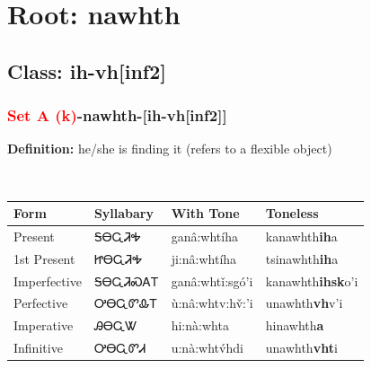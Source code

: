 \needspace{4in}
\section*{Root: nawhth}
\nopagebreak
{}
\needspace{3in}
\subsection*{Class: ih-vh[inf2]}
\nopagebreak
\needspace{2in}
\subsubsection*{\textcolor{Red}{Set A (k)}{-}\textbf{nawhth}{-}[ih-vh[inf2]]}
\nopagebreak
\textbf{Definition: } he/she is finding it (refers to a flexible object)
\\[0.5em]
\begin{tabularx}{\textwidth}{l X X X}%
\toprule%
\textbf{Form}&\textbf{Syllabary}&\textbf{With Tone}&\textbf{Toneless}\\%
\midrule%
Present&ᎦᎾᏩᏘᎭ&ganâ:whtíha&kanawhth\textbf{ih}a\\%
1st Present&ᏥᎾᏩᏘᎭ&ji:nâ:whtíha&tsinawhth\textbf{ih}a\\%
Imperfective&ᎦᎾᏩᏘᏍᎪᎢ&ganâ:whtǐ:sgó’i&kanawhth\textbf{ihsk}o'i\\%
Perfective&ᎤᎾᏩᏛᎲᎢ&ù:nâ:whtv:hv̌:’i&unawhth\textbf{vh}v'i\\%
Imperative&ᎯᎾᏩᏔ&hi:nà:whta&hinawhth\textbf{a}\\%
Infinitive&ᎤᎾᏩᏛᏗ&u:nà:whtv́hdi&unawhth\textbf{vht}i\\%
\bottomrule%
\end{tabularx}
\\[1em]